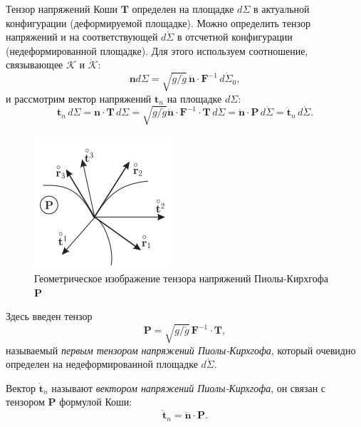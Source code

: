 Тензор напряжений Коши $\mathbf{T}$ определен на площадке $d\Sigma$ в актуальной конфигурации (деформируемой площадке). Можно определить тензор напряжений и на соответствующей $d\mathring{\Sigma}$ в отсчетной конфигурации (недеформированной площадке). Для этого используем соотношение, связывающее $\mathcal{K}$ и $\mathring{\mathcal{K}}$:
\begin{equation*}
	\mathbf{n} d\Sigma = \sqrt{g / \mathring{g}} \, \mathring{\mathbf{n}} \cdot \mathbf{F}^{-1} \, d\mathring{\Sigma}_0,
\end{equation*} 
и рассмотрим вектор напряжений $\mathbf{t}_n$ на площадке $d\Sigma$:
\begin{equation*}
	\mathbf{t}_n \, d\Sigma = \mathbf{n} \cdot \mathbf{T} \, d\Sigma = \sqrt{g / \mathring{g}} \mathring{\mathbf{n}} \cdot \mathbf{F}^{-1} \cdot \mathbf{T} \, d\mathring{\Sigma} = \mathring{\mathbf{n}} \cdot \mathbf{P} \, d\mathring{\Sigma} = \mathring{\mathbf{t}}_n \, d\mathring{\Sigma}.
\end{equation*}

\begin{figure}
	\centering
	\includegraphics[width=0.45\linewidth]{img/que18_4}
	\caption{Геометрическое изображение тензора напряжений Пиолы-Кирхгофа $\mathbf{P}$}
	\label{fig:que18_4}
\end{figure}


Здесь введен тензор 
\begin{equation*}
	\mathbf{P} = \sqrt{g / \mathring{g}} \, \mathbf{F}^{-1} \cdot \mathbf{T},
\end{equation*}
называемый \textit{первым тензором напряжений Пиолы-Кирхгофа}, который очевидно определен на недеформированной площадке $d\mathring{\Sigma}$. 

Вектор $\mathring{\mathbf{t}}_n$ называют \textit{вектором напряжений Пиолы-Кирхгофа}, он связан с тензором $\mathbf{P}$ формулой Коши:
\begin{equation*}
	\mathring{\mathbf{t}}_n = \mathring{\mathbf{n}} \cdot \mathbf{P}.
\end{equation*}

